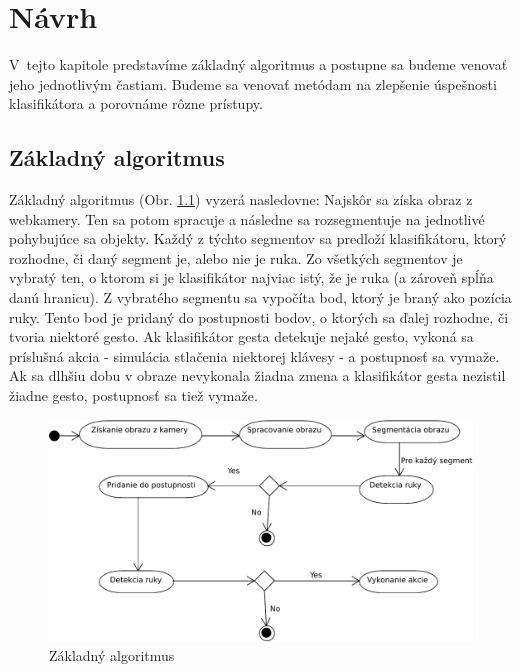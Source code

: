 \chapter{Návrh}\label{chap:design}

V~tejto kapitole predstavíme základný algoritmus a postupne sa budeme venovať jeho jednotlivým častiam. Budeme sa venovať metódam na zlepšenie úspešnosti klasifikátora a porovnáme rôzne prístupy. 
\bigskip

\section{Základný algoritmus}

Základný algoritmus (Obr. \ref{fig:base_alg}) vyzerá nasledovne: 
Najskôr sa získa obraz z webkamery. Ten sa potom spracuje a následne sa rozsegmentuje na jednotlivé pohybujúce sa objekty.
Každý z týchto segmentov sa predloží klasifikátoru, ktorý rozhodne, či daný segment je, alebo nie je ruka. Zo všetkých segmentov je vybratý ten, o ktorom si je klasifikátor najviac istý, že je ruka (a zároveň spĺňa danú hranicu). Z vybratého segmentu sa vypočíta bod, ktorý je braný ako pozícia ruky. Tento bod je pridaný do postupnosti bodov, o ktorých sa ďalej rozhodne, či tvoria niektoré gesto. Ak klasifikátor gesta detekuje nejaké gesto, vykoná sa príslušná akcia - simulácia stlačenia niektorej klávesy - a postupnosť sa vymaže. Ak sa dlhšiu dobu v obraze nevykonala žiadna zmena a klasifikátor gesta nezistil žiadne gesto, postupnosť sa tiež vymaže.

\begin{figure}[htp]
    \centering
    \includegraphics[width=\textwidth]{images/BaseAlgorithm}
    \caption{Základný algoritmus}
    \label{fig:base_alg}
\end{figure}


